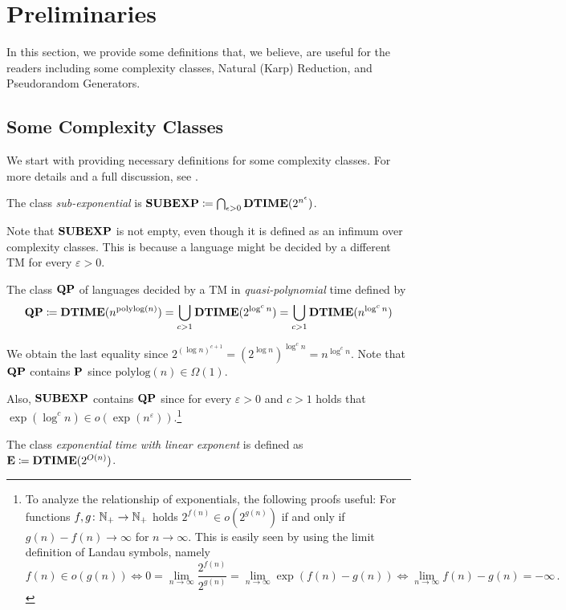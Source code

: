 \documentclass[11pt]{article}
\begin{document}
\newpage
\section{Preliminaries}

In this section, we provide some definitions that, we believe, are useful for the readers including some complexity classes, Natural (Karp) Reduction, and Pseudorandom Generators.

\subsection{Some Complexity Classes}
We start with providing necessary definitions for some complexity classes.
For more details and a full discussion, see \cite{arora2009}.

\begin{definition}
  The class \emph{sub-exponential} is
  $\class{SUBEXP} \coloneqq \bigcap_{\epsilon > 0} \TIME(2^{n^{\epsilon}})$.
\end{definition}

Note that $\class{SUBEXP}$ is not empty, even though it is defined as an infimum
over complexity classes. This is because a language might be decided by a
different TM for every $\varepsilon > 0$.

\begin{definition}
	The class $\class{QP}$ of languages decided by a TM in
	\emph{quasi-polynomial} time defined by
	\[
	\class{QP}
	\coloneqq
	\TIME(n^{\mathrm{polylog}(n)})
	=
	\bigcup_{c > 1}\TIME(2^{\log^c n})
	=
	\bigcup_{c > 1}\TIME(n^{\log^c n})
	\]
\end{definition}
We obtain the last equality since
$2^{(\log n)^{c+1}} = (2^{\log n})^{\log^c n} = n^{\log^c n}$.
%
Note that $\class{QP}$ contains $\P$ since
$\mathrm{polylog}(n) \in \Omega(1)$.

Also, $\class{SUBEXP}$ contains $\class{QP}$ since for every
$\varepsilon > 0$ and $c > 1$ holds that
$\exp(\log^c n) \in o(\exp(n^\varepsilon))$.\footnote{To analyze the
relationship of exponentials, the following proofs useful:
For functions $f, g \colon \N_+ \to \N_+$ holds
$2^{f(n)} \in o(2^{g(n)})$ if and only if $g(n) - f(n) \to \infty$ for
$n \to \infty$.
This is easily seen by using the limit definition of Landau symbols, namely
\[
  f(n) \in o(g(n))
  \iff
  0 = \lim_{n \to \infty} \frac{2^{f(n)}}{2^{g(n)}}
  = \lim_{n \to \infty} \exp(f(n) - g(n))
  \iff
  \lim_{n \to \infty} f(n) - g(n) = -\infty \,.
\]}


\begin{definition}
  The class \emph{exponential time with linear exponent} is defined as
	$\class{E} \coloneqq \TIME(2^{O(n)})$.
\end{definition}
\end{document}
